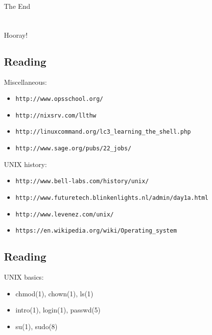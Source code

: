 \documentclass[xga]{xdvislides}
\begin{document}
\newpage
\vspace*{\fill}
\begin{center}
    \Hugesize
        The End \\ [1em]
    \hspace*{5mm}
    \blueline\\
    \hspace*{5mm}\\
        Hooray!
\end{center}
\vspace*{\fill}

\subsection{Reading}
Miscellaneous:
\begin{itemize}
	\item \verb+http://www.opsschool.org/+
	\item \verb+http://nixsrv.com/llthw+
	\item \verb+http://linuxcommand.org/lc3_learning_the_shell.php+
	\item \verb+http://www.sage.org/pubs/22_jobs/+
\end{itemize}

UNIX history:
\begin{itemize}
	\item \verb+http://www.bell-labs.com/history/unix/+
	\item \verb+http://www.futuretech.blinkenlights.nl/admin/day1a.html+
	\item \verb+http://www.levenez.com/unix/+
	\item \verb+https://en.wikipedia.org/wiki/Operating_system+
\end{itemize}

\subsection{Reading}
UNIX basics:
\begin{itemize}
	\item chmod(1), chown(1), ls(1)
	\item intro(1), login(1), passwd(5)
	\item su(1), sudo(8)
\end{itemize}

%
%
\end{document}
